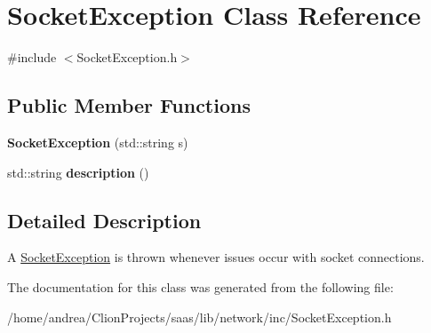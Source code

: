 \hypertarget{class_socket_exception}{}\section{Socket\+Exception Class Reference}
\label{class_socket_exception}


{\ttfamily \#include $<$Socket\+Exception.\+h$>$}

\subsection*{Public Member Functions}
\begin{DoxyCompactItemize}
\item 
{\bfseries Socket\+Exception} (std\+::string s)\hypertarget{class_socket_exception_a09ddb0c061c40fcb527ff89a2e803342}{}\label{class_socket_exception_a09ddb0c061c40fcb527ff89a2e803342}

\item 
std\+::string {\bfseries description} ()\hypertarget{class_socket_exception_ad7920caebddc99b6bbb7dbede569fa18}{}\label{class_socket_exception_ad7920caebddc99b6bbb7dbede569fa18}

\end{DoxyCompactItemize}


\subsection{Detailed Description}
A \hyperlink{class_socket_exception}{Socket\+Exception} is thrown whenever issues occur with socket connections. 

The documentation for this class was generated from the following file\+:\begin{DoxyCompactItemize}
\item 
/home/andrea/\+Clion\+Projects/saas/lib/network/inc/Socket\+Exception.\+h\end{DoxyCompactItemize}

